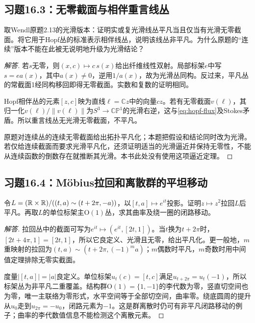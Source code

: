 \subsection*{习题16.3：无零截面与相伴重言线丛}
取Wendl原题2.13的光滑版本：证明实或复光滑线丛平凡当且仅当有光滑无零截面。将它用于Hopf丛的标准表示相伴线丛，说明该线丛非平凡。为什么原题的“连续”版本不能在此被无说明地升级为光滑结论？
\begin{proof}[解答]
若$s$无零，则$(x,c)\mapsto c\,s(x)$给出纤维线性双射。局部标架$e$中写$s=e a(x)$，其中$a(x)\ne0$，逆用$1/a(x)$，故为光滑丛同构。反过来，平凡丛的常截面1经同构移回即得无零截面。实数和复数的证明相同。

Hopf相伴丛的元素$[z,c]$映为直线$\ell=\mathbb Cz$中的向量$cz$。若有无零截面$v(\ell)$，其归一化$v(\ell)/\|v(\ell)\|$为$S^3\to\mathbb{CP}^1$的光滑右逆，这与\eqref{eq:hopf-flux}及Stokes矛盾。所以重言线丛无光滑无零截面，不平凡。

原题对连续丛的连续无零截面给出拓扑平凡化；本题把假设和结论同时改为光滑。若仅给连续截面而要求光滑平凡化，还须证明适当的光滑逼近并保持无零性，不能从连续函数的倒数存在就推断其光滑。本书此处没有使用这项逼近定理。
\end{proof}

\subsection*{习题16.4：Möbius拉回和离散群的平坦移动}
令$L=(\mathbb{R}\times\mathbb{R})/((t,a)\sim(t+2\pi,-a))$，以$[t,a]\mapsto e^{it}$投影。证明$z\mapsto z^2$拉回$L$后平凡。再取$L$的单位标架主$\mathrm O(1)$丛，求其曲率及绕一圈的闭路移动。
\begin{proof}[解答]
拉回丛中的截面可写为$e^{it}\mapsto(e^{it},[2t,1])$。当$t$换为$t+2\pi$时，$[2t+4\pi,1]=[2t,1]$，所以它良定义、光滑且无零，给出平凡化。更一般地，$m$重映射的拉回为$(t,a)\sim(t+2\pi,(-1)^ma)$；$m$偶数时平凡，$m$奇数时用中间值定理排除无零实截面。

度量$|[t,a]|=|a|$良定义。单位标架$u_t(c)=[t,c]$满足$u_{t+2\pi}=u_t(-1)$，所以标架丛为非平凡二重覆盖。结构群$\mathrm O(1)=\{1,-1\}$的李代数为零，竖直切空间也为零，唯一主联络为零形式，水平空间等于全部切空间，曲率零。绕底圆周的提升从$u_0$走到$u_{2\pi}=-u_0$，闭路元素为$-1$。这是群离散时仍可有非平凡闭路移动的例子；曲率的李代数值信息不能检测这个离散元素。
\end{proof}

